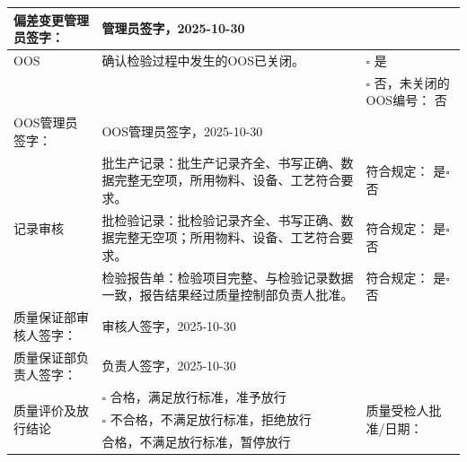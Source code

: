 \documentclass[UTF8,10pt,a4paper,fontset=fandol]{ctexart}
\newcommand{\fieldvalue}[1]{#1}
\newcommand{\handwritten}[1]{#1}
\begin{document}
\begin{center}
\begin{tabularx}{\textwidth}{|p{2.1cm}|X|p{3.4cm}|}
偏差变更管理员签字：
&
\fieldvalue{\handwritten{管理员签字，2025-10-30}}
& \\ \hline

\multirow{1}{*}{OOS}
& 确认检验过程中发生的OOS已关闭。
&
$\square$ 是\\
& & $\square$ 否，未关闭的OOS编号：
\fieldvalue{否}
\\ \hline

OOS管理员签字：
&
\fieldvalue{\handwritten{OOS管理员签字，2025-10-30}}
& \\ \hline

\multirow{3}{*}{记录审核}
& 批生产记录：批生产记录齐全、书写正确、数据完整无空项，所用物料、设备、工艺符合要求。
&
符合规定：
\fieldvalue{是}\quad $\square$ 否
\\ \cline{2-3}
& 批检验记录：批检验记录齐全、书写正确、数据完整无空项；所用物料、设备、工艺符合要求。
&
符合规定：
\fieldvalue{是}\quad $\square$ 否
\\ \cline{2-3}
& 检验报告单：检验项目完整、与检验记录数据一致，报告结果经过质量控制部负责人批准。
&
符合规定：
\fieldvalue{是}\quad $\square$ 否
\\ \hline

质量保证部审核人签字：
&
\fieldvalue{\handwritten{审核人签字，2025-10-30}}
& \\ \hline

质量保证部负责人签字：
&
\fieldvalue{\handwritten{负责人签字，2025-10-30}}
& \\ \hline

\multirow{3}{*}{质量评价及放行结论}
& $\square$ 合格，满足放行标准，准予放行
& \multirow{3}{*}{质量受检人批准/日期：} \\ \cline{2-2}
& $\square$ 不合格，不满足放行标准，拒绝放行
& \\ \cline{2-2}
& 
\fieldvalue{合格，不满足放行标准，暂停放行}
& \\ \hline
\end{tabularx}
\end{center}
\end{document}

